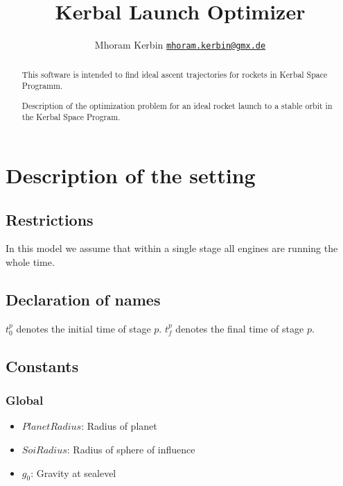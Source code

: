 \documentclass[11pt]{report}
\begin{document}
\title{Kerbal Launch Optimizer}
\author {Mhoram Kerbin \href{mailto:mhoram.kerbin@gmx.de}{\nolinkurl{mhoram.kerbin@gmx.de}}}

\maketitle

\begin{abstract}

  This software is intended to find ideal ascent trajectories for
  rockets in Kerbal Space Programm.

  Description of the optimization problem for an ideal rocket launch
  to a stable orbit in the Kerbal Space Program.

\end{abstract}

\tableofcontents

\chapter{Description of the setting}

\section{Restrictions}

In this model we assume that within a single stage all engines are
running the whole time.

\section{Declaration of names}

$t_0^p$ denotes the initial time of stage $p$.
$t_f^p$ denotes the final time of stage $p$.

\section{Constants}

\subsection{Global}

\begin{itemize}
\item $PlanetRadius$: Radius of planet
\item $SoiRadius$: Radius of sphere of influence
\item $g_0$: Gravity at sealevel
\end{itemize}
\end{document}
